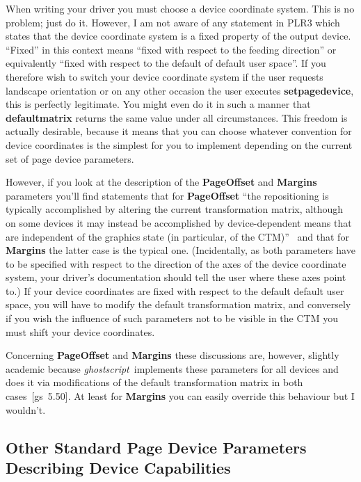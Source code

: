 \documentclass[twoside,a4paper]{article}
\newcommand{\gs}{\textit{ghostscript\/}}
\newcommand{\ps}[1]{{\sffamily\bfseries #1}}	%
\begin{document}
When writing your driver you must choose a device coordinate system.
This is no problem; just do it.
However, I am not aware of any statement in PLR3 which states that the
device coordinate system is a fixed property of the output device.
``Fixed'' in this context means ``fixed with respect to the feeding direction''
or equivalently ``fixed with respect to the default of default user space''.
If you therefore wish to switch your device coordinate system if the user
requests landscape orientation or on any other occasion the user executes
\ps{setpagedevice},
this is perfectly legitimate.
You might even do it in such a manner that \ps{defaultmatrix} returns the
same value under all circumstances.
This freedom is actually desirable,
because it means that you can choose whatever convention for device coordinates
is the simplest for you to implement depending on the current set of
page device parameters.

However, if you look at the description of the \ps{PageOffset} and \ps{Margins}
parameters you'll find statements that for \ps{PageOffset}
``the repositioning is typically accomplished by altering the current
transformation matrix, although on some devices it may instead be accomplished
by device-dependent means that are independent of the graphics state
(in particular, of the CTM)''~\cite[page 415]{PostScript3} and that
for \ps{Margins} the latter case is the typical one.
(Incidentally, as both parameters have to be specified with respect to the
direction of the axes of the device coordinate system,
your driver's documentation should tell the user where these axes point to.)
If your device coordinates are fixed with respect to the default default user
space,
you will have to modify the default transformation matrix,
and conversely if you wish the influence of such parameters not to be visible
in the CTM you must shift your device coordinates.

Concerning \ps{PageOffset} and \ps{Margins} these discussions are, however,
slightly academic because \gs\ implements these parameters for all devices
and does it via modifications of the default transformation matrix
in both cases~[gs~5.50].
At least for \ps{Margins} you can easily override this behaviour but I wouldn't.


\subsection{Other Standard Page Device Parameters Describing Device
  Capabilities}
\end{document}

